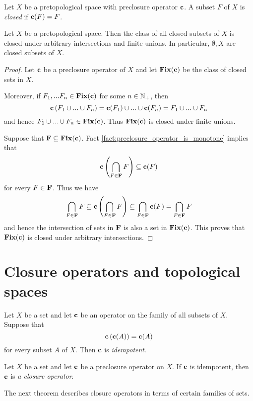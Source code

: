 \begin{definition}
	Let $X$ be a pretopological space with preclosure operator $\mathbf{c}$. A subset $F$ of $X$ is \textit{closed} if $\mathbf{c}(F) = F$.
\end{definition}

\begin{proposition}\label{proposition:closed_subsets_of_pretopological_space}
	Let $X$ be a pretopological space. Then the class of all closed subsets of $X$ is closed under arbitrary intersections and finite unions. In particular, $\emptyset, X$ are closed subsets of $X$.
\end{proposition}
\begin{proof}
	Let $\mathbf{c}$ be a preclosure operator of $X$ and let $\mathbf{Fix}(\mathbf{c})$ be the class of closed sets in $X$.

	Moreover, if $F_1,...F_n \in \mathbf{Fix}(\mathbf{c})$ for some $n \in {\mathbb N}_+$, then
	$$\mathbf{c}\left(F_1 \cup ... \cup F_n\right) = \mathbf{c}(F_1) \cup ... \cup \mathbf{c}(F_n) = F_1 \cup ...\cup F_n$$
	and hence $F_1 \cup ... \cup F_n \in \mathbf{Fix}(\mathbf{c})$. Thus $\mathbf{Fix}(\mathbf{c})$ is closed under finite unions.

	Suppose that $\mathbf{F} \subseteq \mathbf{Fix}(\mathbf{c})$. Fact \ref{fact:preclosure_operator_is_monotone} implies that
	$$\mathbf{c}\left(\bigcap_{F\in \mathbf{F}}F\right) \subseteq \mathbf{c}(F)$$
	for every $F \in \mathbf{F}$. Thus we have
	$$\bigcap_{F \in \mathbf{F}}F \subseteq \mathbf{c}\left(\bigcap_{F\in \mathbf{F}}F\right) \subseteq \bigcap_{F\in \mathbf{F}}\mathbf{c}(F) = \bigcap_{F\in \mathbf{F}}F$$
	and hence the intersection of sets in $\mathbf{F}$ is also a set in $\mathbf{Fix}(\mathbf{c})$. This proves that $\mathbf{Fix}(\mathbf{c})$ is closed under arbitrary intersections.
\end{proof}

\section{Closure operators and topological spaces}

\begin{definition}
	Let $X$ be a set and let $\mathbf{c}$ be an operator on the family of all subsets of $X$. Suppose that
	$$\mathbf{c}\left(\mathbf{c}(A)\right) = \mathbf{c}(A)$$
	for every subset $A$ of $X$. Then $\mathbf{c}$ is \textit{idempotent}.
\end{definition}

\begin{definition}
	Let $X$ be a set and let $\mathbf{c}$ be a preclosure operator on $X$. If $\mathbf{c}$ is idempotent, then $\mathbf{c}$ is \textit{a closure operator}.
\end{definition}
\noindent
The next theorem describes closure operators in terms of certain families of sets.

